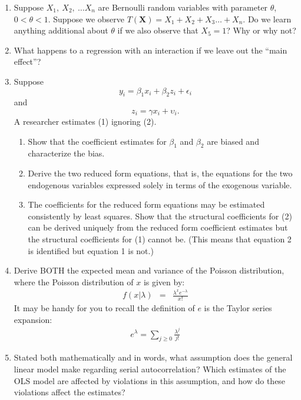 \documentclass[12pt]{article}
\begin{document}
\begin{enumerate}
\item Suppose $X_1,\ X_2,\ \ldots X_n$ are Bernoulli random variables with parameter $\theta$, $0<\theta<1$.  Suppose we observe $T(\mathbf{X})=X_1+X_2+X_3\ldots+X_n$.   Do we learn anything additional about $\theta$ if we also observe that $X_5=1$?  Why or why not?

\item What happens to a regression with an interaction if we leave out the ``main effect''?

\item Suppose 
    \begin{equation}  y_i = \beta_1 x_i +\beta_2 z_i +\epsilon_i \end{equation}
and 
    \begin{equation} z_i = \gamma x_i + \upsilon_i. \end{equation}
A researcher estimates (1) ignoring (2).  
\begin{enumerate}
  \item Show that the coefficient estimates for $\beta_1$ and $\beta_2$ are biased and characterize the bias.
  \item Derive the two reduced form equations, that is, the equations for the two endogenous variables expressed solely in terms of the exogenous variable.
  \item The coefficients for the reduced form equations may be estimated consistently by least squares.  Show that the structural coefficients for (2) can be derived uniquely from the reduced form coefficient estimates but the structural coefficients for (1) cannot be.  (This means that equation 2 is identified but equation 1 is not.)
  \end{enumerate}

\item Derive BOTH the expected mean and variance of the Poisson distribution, where the Poisson distribution of $x$ is given by:
\begin{eqnarray*}
f(x|\lambda) & = & \frac{\lambda^x e^{-\lambda}}{x!}
\end{eqnarray*}
It may be handy for you to recall the definition of $e$ is the Taylor series expansion:
\begin{eqnarray*}
e^\lambda = \sum_{j\ge0} \frac{\lambda^j}{j!}
\end{eqnarray*}

\item Stated both mathematically and in words, what assumption does the general linear model make regarding serial autocorrelation? Which estimates of the OLS model are affected by violations in this assumption, and how do these violations affect the estimates? 

\end{enumerate}
\end{document}
